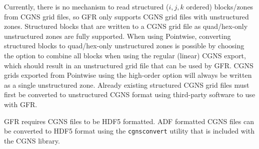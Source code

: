 
\label{SEC:Files:Grid_Input:CGNS:Limitations}

Currently, there is no mechanism to read structured (\thatis $i,j,k$ ordered)
blocks\slash zones from CGNS grid files, so GFR only supports CGNS grid files
with unstructured zones.
%
Structured blocks that are written to a CGNS grid file as quad\slash hex-only
unstructured zones are fully supported.
%
When using Pointwise, converting structured blocks to quad\slash hex-only
unstructured zones is possible by choosing the option to combine all blocks when
using the regular (\thatis linear) CGNS export, which should result in an
unstructured grid file that can be used by GFR.
%
CGNS grids exported from Pointwise using the high-order option will always be
written as a single unstructured zone.
%
Already existing structured CGNS grid files must first be converted to
unstructured CGNS format using third-party software to use with GFR.


GFR requires CGNS files to be HDF5 formatted.
%
ADF formatted CGNS files can be converted to HDF5 format using the
\texttt{cgnsconvert} utility that is included with the CGNS library.


